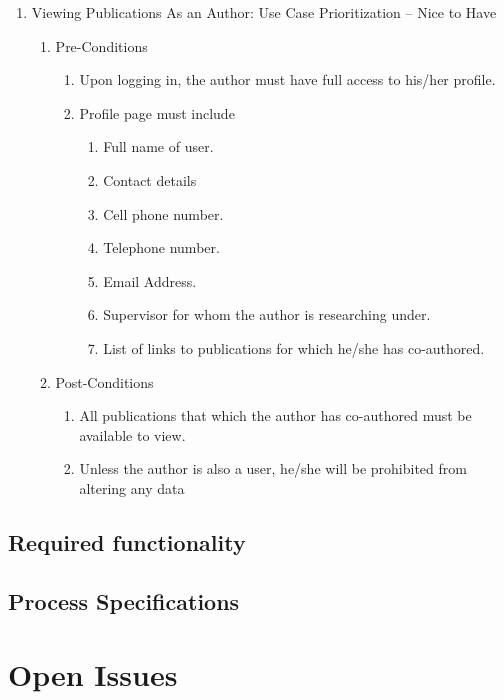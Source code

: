 \documentclass[hidelinks,a4paper,12pt]{article}
\begin{document}
\begin{enumerate}
	\item  Viewing Publications As an Author: Use Case Prioritization -- Nice to Have
	
	\begin{enumerate}
		\item  Pre-Conditions
		
		\begin{enumerate}
			\item  Upon logging in, the author must have full access to his/her profile.
			
			\item  Profile page must include
			
			\begin{enumerate}
				\item  Full name of user.
				
				\item  Contact details
				
				\item  Cell phone number.
				
				\item  Telephone number.
				
				\item  Email Address.
				
				\item  Supervisor for whom the author is researching under.
				
				\item  List of links to publications for which he/she has co-authored.
			\end{enumerate}
		\end{enumerate}
		
		\item  Post-Conditions
		
		\begin{enumerate}
			\item  All publications that which the author has co-authored must be available to view.
			
			\item  Unless the author is also a user, he/she will be prohibited from altering any data  
		\end{enumerate}
	\end{enumerate}
\end{enumerate}

\subsection{Required functionality}

\subsection{Process Specifications}


\section{Open Issues}

%
%
\end{document}
